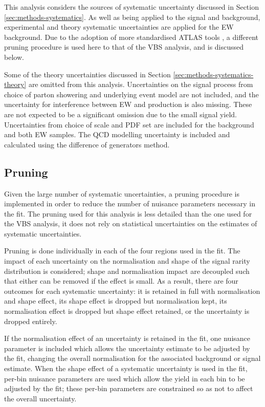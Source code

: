 
This analysis considers the sources of systematic uncertainty discussed in
Section \ref{sec:methods-systematics}. As well as being applied to the signal
and \QCDZy background, experimental and theory systematic
uncertainties are applied for the \ac{EW} \Zyjj background. Due to the adoption
of more standardised \ac{ATLAS} tools \cite{trexfitter}, a different pruning
procedure is used here to that of the \ac{VBS} analysis, and is discussed below.

Some of the theory uncertainties discussed in Section
\ref{sec:methods-systematics-theory} are omitted from this analysis.
Uncertainties on the signal process from choice of parton showering and
underlying event model are not included, and the uncertainty for interference
between \ac{EW} and \QCDZy production is also missing. These are not
expected to be a significant omission due to the small signal yield.
Uncertainties from choice of scale and \ac{PDF} set are included for the
\QCDZy background and both \ac{EW} \Zyjj samples. The QCD modelling uncertainty is
included and calculated using the difference of generators method.


\subsection{Pruning}
Given the large number of systematic uncertainties, a pruning procedure is
implemented in order to reduce the number of nuisance parameters necessary in
the fit. The pruning used for this analysis is less detailed than the one used
for the \ac{VBS} \Zy analysis, it does not rely on statistical uncertainties on
the estimates of systematic uncertainties.

Pruning is done individually in each of the four regions used in the fit.
The impact of each uncertainty on the normalisation and shape of the signal
rarity distribution is considered; shape and normalisation impact are decoupled
such that either can be removed if the effect is small. As a result, there are
four outcomes for each systematic uncertainty: it is retained in full with
normalisation and shape effect, its shape effect is dropped but normalisation
kept, its normalisation effect is dropped but shape effect retained, or the
uncertainty is dropped entirely.

If the normalisation effect of an uncertainty is retained in the fit, one
nuisance parameter is included which allows the uncertainty estimate to be
adjusted by the fit, changing the overall normalisation for the associated
background or signal estimate. When the shape effect of a systematic uncertainty
is used in the fit, per-bin nuisance parameters are used which allow the yield
in each bin to be adjusted by the fit; these per-bin parameters are constrained
so as not to affect the overall uncertainty.

